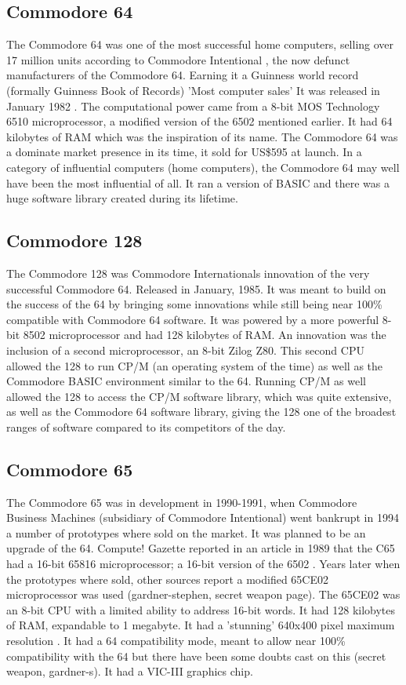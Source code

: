 \subsection{Commodore 64}
The Commodore 64 was one of the most successful home computers, selling over 17 million units according to Commodore Intentional \cite{pagetable}, the now defunct manufacturers of the Commodore 64. Earning it  a Guinness world record (formally Guinness Book of Records) 'Most computer sales' \cite{guinness}
It was released in January 1982 \cite{infoworld82}. The computational power came from a 8-bit MOS Technology 6510 microprocessor, a modified version of the 6502 mentioned earlier. It had 64 kilobytes of RAM which was the inspiration of its name. The Commodore 64 was a dominate market presence in its time, it sold for US\$595 at launch. In a category of influential computers (home computers), the Commodore 64 may well have been the most influential of all. It ran a version of BASIC and there was a huge software library created during its lifetime.

\subsection{Commodore 128}
The Commodore 128 was Commodore Internationals innovation of the very successful Commodore 64. Released in January, 1985. It was meant to build on the success of the 64 by bringing some innovations while still being near 100\% compatible with Commodore 64 software. It was powered by a more powerful 8-bit 8502 microprocessor and had 128 kilobytes of RAM. An innovation was the inclusion of a second microprocessor, an 8-bit Zilog Z80. This second CPU allowed the 128 to run CP/M (an operating system of the time) as well as the Commodore BASIC environment similar to the 64. Running CP/M as well allowed the 128 to access the CP/M software library, which was quite extensive, as well as the Commodore 64 software library, giving the 128 one of the broadest ranges of software compared to its competitors of the day.

\subsection{Commodore 65}
The Commodore 65 was in development in 1990-1991, when Commodore Business Machines (subsidiary of Commodore Intentional) went bankrupt in 1994 a number of prototypes where sold on the market. It was planned to be an upgrade of the 64. Compute! Gazette reported in an article in 1989 that the C65 had a 16-bit 65816 microprocessor; a 16-bit version of the 6502 \cite{gazette89}. Years later when the prototypes where sold, other sources report a modified 65CE02 microprocessor was used (gardner-stephen, secret weapon page). The 65CE02 was an 8-bit CPU with a limited ability to address 16-bit words. It had 128 kilobytes of RAM, expandable to 1 megabyte. It had a 'stunning' 640x400 pixel maximum resolution \cite{gazette89}. It had a 64 compatibility mode, meant to allow near 100\% compatibility with the 64 but there have been some doubts cast on this (secret weapon, gardner-s). It had a VIC-III graphics chip.

